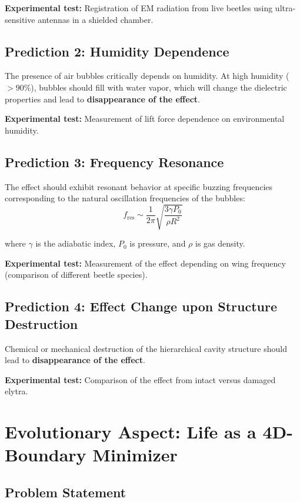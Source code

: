 \documentclass[12pt,a4paper]{article}
\begin{document}
\textbf{Experimental test:} Registration of EM radiation from live beetles using ultra-sensitive antennas in a shielded chamber.

\subsection{Prediction 2: Humidity Dependence}

The presence of air bubbles critically depends on humidity. At high humidity ($> 90\%$), bubbles should fill with water vapor, which will change the dielectric properties and lead to \textbf{disappearance of the effect}.

\textbf{Experimental test:} Measurement of lift force dependence on environmental humidity.

\subsection{Prediction 3: Frequency Resonance}

The effect should exhibit resonant behavior at specific buzzing frequencies corresponding to the natural oscillation frequencies of the bubbles:
\begin{equation}
    f_{\text{res}} \sim \frac{1}{2\pi} \sqrt{\frac{3\gamma P_0}{\rho R^2}}
    \label{eq:resonance}
\end{equation}

where $\gamma$ is the adiabatic index, $P_0$ is pressure, and $\rho$ is gas density.

\textbf{Experimental test:} Measurement of the effect depending on wing frequency (comparison of different beetle species).

\subsection{Prediction 4: Effect Change upon Structure Destruction}

Chemical or mechanical destruction of the hierarchical cavity structure should lead to \textbf{disappearance of the effect}.

\textbf{Experimental test:} Comparison of the effect from intact versus damaged elytra.

\section{Evolutionary Aspect: Life as a 4D-Boundary Minimizer}

\subsection{Problem Statement}
\end{document}
